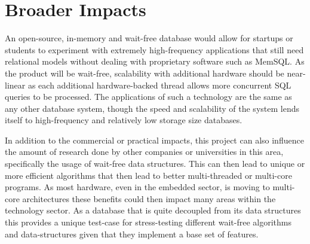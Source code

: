 \documentclass[letterpaper, 12pt]{article}
\begin{document}
\section{Broader Impacts}
An open-source, in-memory and wait-free database would allow for startups or students to
experiment with extremely high-frequency applications that still need relational
models without dealing with proprietary software such as MemSQL. As the product
will be wait-free, scalability with additional hardware should be near-linear as each
additional hardware-backed thread allows more concurrent SQL queries to be processed.
The applications of such a technology are the same as any other database system,
though the speed and scalability of the system lends itself to high-frequency and
relatively low storage size databases.
\par\vspace{\baselineskip}
In addition to the commercial or practical impacts, this project can also influence the
amount of research done by other companies or universities in this area, specifically the
usage of wait-free data structures. This can then lead to unique or more efficient
algorithms that then lead to better multi-threaded or multi-core programs. As most hardware,
even in the embedded sector, is moving to multi-core architectures these benefits could
then impact many areas within the technology sector. As a database that is quite decoupled
from its data structures this provides a unique test-case for stress-testing different wait-free
algorithms and data-structures given that they implement a base set of features.
\newpage
\end{document}
